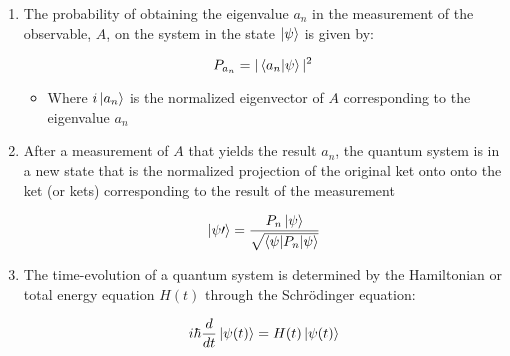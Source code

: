 \begin{itemize}
\begin{enumerate}
      \item The probability of obtaining the eigenvalue $a_n$ in the measurement of the observable, $A$, on the system in the state $\ket{\psi}$ is given by:

        $$P_{a_n}=|\bra{a_n}\ket{\psi}|^2$$

        \begin{itemize}

          \item Where $i\ket{a_n}$ is the normalized eigenvector of $A$ corresponding to the eigenvalue $a_n$

        \end{itemize}

      \item After a measurement of $A$ that yields the result $a_n$, the quantum system is in a new state that is the normalized projection of the original ket onto onto the ket (or kets) corresponding to the result of the measurement

        $$\ket{\psi\prime}=\frac{P_n\ket{\psi}}{\sqrt{\bra{\psi | P_n}\ket{\psi}}}$$

      \item The time-evolution of a quantum system is determined by the Hamiltonian or total energy equation $H(t)$ through the Schr\"odinger equation:

        $$i\hbar\frac{d}{dt}\ket{\psi(t)}=H(t)\ket{\psi(t)}$$

    \end{enumerate}

\end{itemize}




